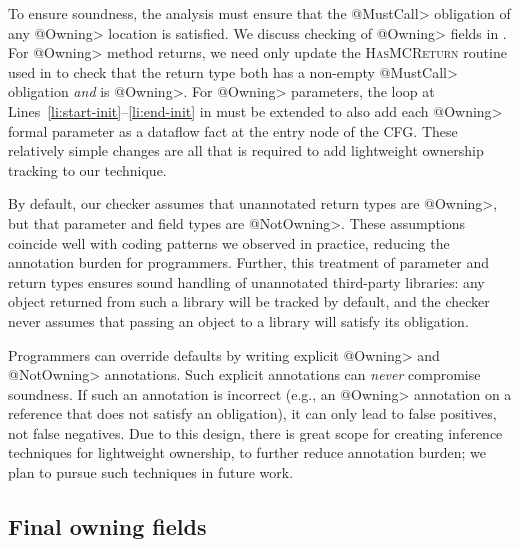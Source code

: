 To ensure soundness, the analysis must ensure that the \<@MustCall> obligation
of any \<@Owning> location is satisfied.  We discuss checking of \<@Owning>
fields in .  For \<@Owning> method returns, we need only
update the \textsc{Has\-MCReturn} routine used in  to check that
the return type both has a non-empty \<@MustCall> obligation \emph{and} is
\<@Owning>.  For \<@Owning> parameters, the loop at
Lines~\ref{li:start-init}--\ref{li:end-init} in 
must be extended to also add each \<@Owning> formal parameter as a dataflow
fact at the entry node of the CFG.  These relatively simple changes are all that
is required to add lightweight ownership tracking to our technique.

By default, our checker assumes that unannotated return types are \<@Owning>,
but that parameter and field types are \<@NotOwning>.  These assumptions
coincide well with coding patterns we observed in practice, reducing the
annotation burden for programmers.  Further, this treatment of parameter and
return types ensures sound handling of unannotated third-party libraries: any
object returned from such a library will be tracked by default, and the checker
never assumes that passing an object to a library will satisfy its obligation.

Programmers can override defaults by writing explicit \<@Owning> and
\<@NotOwning> annotations.  Such explicit annotations can \emph{never}
compromise soundness.  If such an annotation is incorrect (e.g., an \<@Owning>
annotation on a reference that does not satisfy an obligation), it can only lead
to false positives, not false negatives.  Due to this design, there is great
scope for creating inference techniques for lightweight ownership, to further
reduce annotation burden; we plan to pursue such techniques in future work.


\subsection{Final owning fields}
\label{sec:owning-fields}

